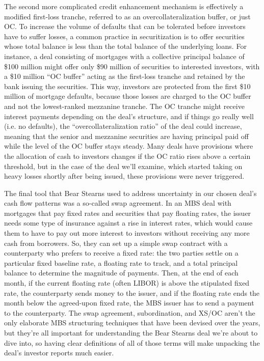 \documentclass[12pt]{article}
\begin{document}
The second more complicated credit enhancement mechanism is effectively a modified first-loss tranche, referred to as an overcollateralization buffer, or just OC. To increase the volume of defaults that can be tolerated before investors have to suffer losses, a common practice in securitization is to offer securities whose total balance is less than the total balance of the underlying loans. For instance, a deal consisting of mortgages with a collective principal balance of \$100 million might offer only \$90 million of securities to interested investors, with a \$10 million “OC buffer” acting as the first-loss tranche and retained by the bank issuing the securities. This way, investors are protected from the first \$10 million of mortgage defaults, because those losses are charged to the OC buffer and not the lowest-ranked mezzanine tranche. The OC tranche might receive interest payments depending on the deal’s structure, and if things go really well (i.e. no defaults), the “overcollateralization ratio” of the deal could increase, meaning that the senior and mezzanine securities are having principal paid off while the level of the OC buffer stays steady. Many deals have provisions where the allocation of cash to investors changes if the OC ratio rises above a certain threshold, but in the case of the deal we’ll examine, which started taking on heavy losses shortly after being issued, these provisions were never triggered.
	
	The final tool that Bear Stearns used to address uncertainty in our chosen deal’s cash flow patterns was a so-called swap agreement. In an MBS deal with mortgages that pay fixed rates and securities that pay floating rates, the issuer needs some type of insurance against a rise in interest rates, which would cause them to have to pay out more interest to investors without receiving any more cash from borrowers. So, they can set up a simple swap contract with a counterparty who prefers to receive a fixed rate: the two parties settle on a particular fixed baseline rate, a floating rate to track, and a total principal balance to determine the magnitude of payments. Then, at the end of each month, if the current floating rate (often LIBOR) is above the stipulated fixed rate, the counterparty sends money to the issuer, and if the floating rate ends the month below the agreed-upon fixed rate, the MBS issuer has to send a payment to the counterparty. The swap agreement, subordination, and XS/OC aren’t the only elaborate MBS structuring techniques that have been devised over the years, but they’re all important for understanding the Bear Stearns deal we’re about to dive into, so having clear definitions of all of those terms will make unpacking the deal’s investor reports much easier. 
\end{document}
